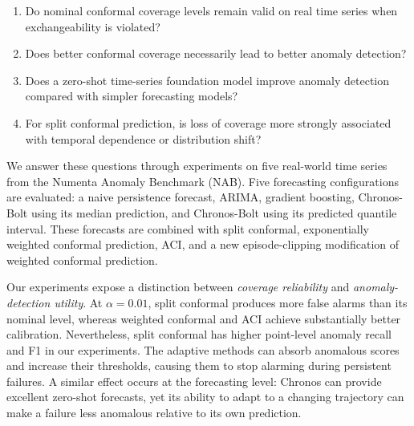 \documentclass[11pt]{article}
\theoremstyle{definition}
\theoremstyle{remark}
\begin{document}
\begin{enumerate}[leftmargin=*]
\item[\textbf{RQ1:}] Do nominal conformal coverage levels remain valid on real time series when exchangeability is violated?
\item[\textbf{RQ2:}] Does better conformal coverage necessarily lead to better anomaly detection?
\item[\textbf{RQ3:}] Does a zero-shot time-series foundation model improve anomaly detection compared with simpler forecasting models?
\item[\textbf{RQ4:}] For split conformal prediction, is loss of coverage more strongly associated with temporal dependence or distribution shift?
\end{enumerate}

We answer these questions through experiments on five real-world time series from the Numenta Anomaly Benchmark (NAB). Five forecasting configurations are evaluated: a naive persistence forecast, ARIMA, gradient boosting, Chronos-Bolt using its median prediction, and Chronos-Bolt using its predicted quantile interval. These forecasts are combined with split conformal, exponentially weighted conformal prediction, ACI, and a new episode-clipping modification of weighted conformal prediction.

Our experiments expose a distinction between \emph{coverage reliability} and \emph{anomaly-detection utility}. At $\alpha=0.01$, split conformal produces more false alarms than its nominal level, whereas weighted conformal and ACI achieve substantially better calibration. Nevertheless, split conformal has higher point-level anomaly recall and F1 in our experiments. The adaptive methods can absorb anomalous scores and increase their thresholds, causing them to stop alarming during persistent failures. A similar effect occurs at the forecasting level: Chronos can provide excellent zero-shot forecasts, yet its ability to adapt to a changing trajectory can make a failure less anomalous relative to its own prediction.
\end{document}
